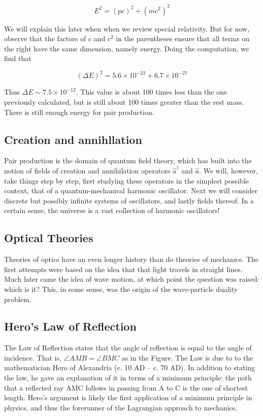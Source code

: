 \begin{equation}
 E^2 = (pc)^2 + ( mc^2 )^2
\end{equation}

We will explain this later when when we review special relativity.  But for now, observe that the factors of $c$ and $c^2$ in the parentheses ensure that all terms on the right have the same dimension, namely energy.  Doing the computation, we find that

\begin{equation}
(\Delta E)^2 = 5.6\times 10^{-23} + 6.7\times 10^{-27} 
\end{equation}

Thus $\Delta E \sim 7.5\times 10^{-12}$.  This value is about 100 times less than the one previously calculated, but is still about 100 times greater than the rest mass.  There is still enough energy for pair production.

\subsection{Creation and annihllation}
Pair production is the domain of quantum field theory, which has built into the notion of fields of creation and annihilation operators $\hat a^\dagger$ and $\hat a$.  We will, however, take things step by step, first studying these operators in the simplest possible context, that of a quantum-mechanical harmonic oscillator.  Next we will consider discrete but possibly infinite systems of oscillators, and lastly fields thereof.  In a certain sense, the universe is a vast collection of harmonic oscillators!

\subsection{Optical Theories}

Theories of optics have an even longer history than do theories of mechanics.  The first attempts were based on the idea that that light travels in straight lines.  Much later came the idea of wave motion, at which point the question was raised: which is it? This, in some sense, was the origin of the wave-particle duality problem.

\subsection{Hero's Law of Reflection}

The Law of Reflection states that the angle of reflection is equal to the angle of incidence.  That is, $\angle AMB = \angle BMC$ as in the Figure.  The Law is due to to the mathematician Hero of Alexandria (c. 10 AD -- c. 70 AD).  In addition to stating the law, he gave an explanation of it in terms of a minimum principle: the path that a reflected ray AMC follows in passing from A to C is the one of shortest length.  Hero's argument is likely the first application of a minimum principle in physics, and thus the forerunner of the Lagrangian approach to mechanics.

